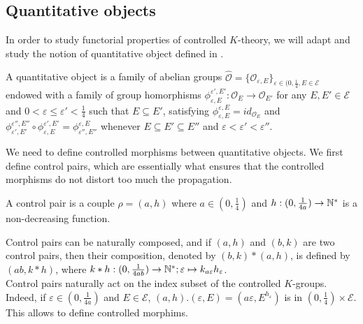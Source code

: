 \subsection{Quantitative objects}

In order to study functorial properties of controlled $K$-theory, we will adapt and study the notion of quantitative object defined in \cite{OY2}.\\

\begin{definition}
A quantitative object is a family of abelian groups $\hat{\mathcal{O}}=\{\mathcal{O}_{\varepsilon, E}\}_{\varepsilon\in (0,\frac{1}{4}, E\in\mathcal{E}}$ endowed with a family of group homorphisms $\phi_{\varepsilon, E}^{\varepsilon', E'} : \mathcal{O}_E\rightarrow \mathcal{O}_{E'}$ for any $E,E'\in\mathcal E$ and $0<\varepsilon\leq \varepsilon'<\frac{1}{4}$ such that $E\subseteq E'$, satisfying $\phi_{\varepsilon, E}^{\varepsilon, E}= id_{\mathcal{O}_E}$ and $\phi_{\varepsilon', E'}^{\varepsilon'', E''}\circ \phi_{\varepsilon, E}^{\varepsilon', E'} =\phi_{\varepsilon'', E''}^{\varepsilon, E}$ whenever $E\subseteq E' \subseteq E''$ and $\varepsilon<\varepsilon'<\varepsilon''$.
\end{definition}

We need to define controlled morphisms between quantitative objects. We first define control pairs, which are essentially what ensures that the controlled morphisms do not distort too much the propagation.\\

\begin{definition}
A control pair is a couple $\rho=(a,h)$ where $a\in (0,\frac{1}{4})$ and $h : (0,\frac{1}{4a})\rightarrow \mathbb N^*$ is a non-decreasing function. 
\end{definition}

Control pairs can be naturally composed, and if $(a,h)$ and $(b,k)$ are two control pairs, then their composition, denoted by $(b,k)\ast(a,h)$, is defined by $(ab,k\ast h)$, where $k\ast h : (0,\frac{1}{4ab})\rightarrow \mathbb N^* ; \varepsilon \mapsto k_{a \varepsilon}h_\varepsilon$. \\

Control pairs naturally act on the index subset of the controlled $K$-groups. Indeed, if $\varepsilon\in (0,\frac{1}{4a})$ and $E\in\mathcal E$, $(a,h).(\varepsilon,E)= (a\varepsilon,E^{h_\varepsilon})$ is in $(0,\frac{1}{4})\times\mathcal E$. This allows to define controlled morphims.\\

